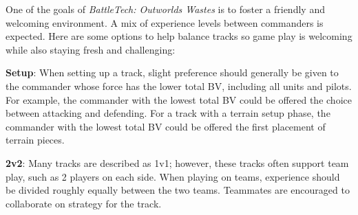 One of the goals of \emph{BattleTech: Outworlds Wastes} is to foster a friendly and welcoming environment.
A mix of experience levels between commanders is expected.
Here are some options to help balance tracks so game play is welcoming while also staying fresh and challenging:

\begin{description}

  \item {\bfseries Setup}: When setting up a track, slight preference should generally be given to the commander whose force has the lower total BV, including all units and pilots.
    For example, the commander with the lowest total BV could be offered the choice between attacking and defending.
    For a track with a terrain setup phase, the commander with the lowest total BV could be offered the first placement of terrain pieces.

  \item {\bfseries 2v2}: Many tracks are described as 1v1; however, these tracks often support team play, such as 2 players on each side.
    When playing on teams, experience should be divided roughly equally between the two teams.
    Teammates are encouraged to collaborate on strategy for the track.

\end{description}
